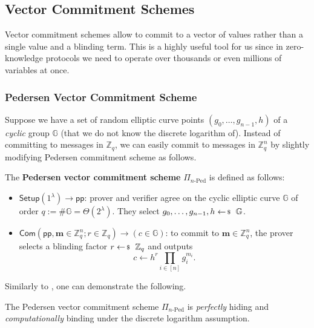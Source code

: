 \documentclass[../../book]{subfiles}
\begin{document}
\subsection{Vector Commitment Schemes}

Vector commitment schemes allow to commit to a vector of values rather than a single value and a blinding term.
This is a highly useful tool for us since in zero-knowledge protocols we need to operate over thousands or even millions of variables at once.

\subsubsection{Pedersen Vector Commitment Scheme}

Suppose we have a set of random elliptic curve points $(g_0, \ldots, g_{n-1}, h)$ of a \emph{cyclic} group $\mathbb{G}$ (that we do not know the discrete logarithm of).
Instead of committing to messages in $\mathbb{Z}_q$, we can easily commit to messages in $\mathbb{Z}_q^n$ by slightly modifying Pedersen commitment scheme as follows.

\begin{definition}
    The \textbf{Pedersen vector commitment scheme} $\Pi_{n\text{-Ped}}$ is defined as follows:
    \begin{itemize}
        \item $\mathsf{Setup}(1^{\lambda}) \to \mathsf{pp}$: prover and verifier agree on the cyclic elliptic curve $\mathbb{G}$ of order $q:=\#\mathbb{G}=\Theta(2^{\lambda})$.
        They select $g_0,\dots,g_{n-1},h \leftarrowS \mathbb{G}$.
        \item $\mathsf{Com}(\mathsf{pp}, \mathbf{m} \in \mathbb{Z}_q^n; r \in \mathbb{Z}_q) \to (c \in \mathbb{G})$: to commit to $\mathbf{m} \in \mathbb{Z}_q^n$, the prover selects a blinding factor $r \leftarrowS \mathbb{Z}_q$ and outputs
        \begin{equation*}
            c \gets h^r\prod_{i \in [n]} g_i^{m_i}.
        \end{equation*}
    \end{itemize}
\end{definition}

Similarly to , one can demonstrate the following.

\begin{lemma}
    The Pedersen vector commitment scheme $\Pi_{n\text{-Ped}}$ is \emph{perfectly} hiding and \emph{computationally} binding under the discrete logarithm assumption.
\end{lemma}
\end{document}
